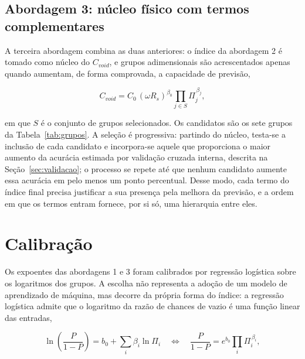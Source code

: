 \documentclass[12pt,openany]{report}
\begin{document}
\subsection{Abordagem 3: núcleo físico com termos complementares}
\label{sec:abordagem_c}

A terceira abordagem combina as duas anteriores: o índice da abordagem 2 é tomado como núcleo do $C_{void}$, e grupos adimensionais são acrescentados apenas quando aumentam, de forma comprovada, a capacidade de previsão,

\begin{equation}
C_{void} = C_0\,(\omega R_s)^{\beta_0} \prod_{j \in S} \Pi_{j}^{\,\beta_j},
\label{eq:cvoid_c}
\end{equation}

\noindent em que $S$ é o conjunto de grupos selecionados. Os candidatos são os sete grupos da Tabela~\ref{tab:grupos}. A seleção é progressiva: partindo do núcleo, testa-se a inclusão de cada candidato e incorpora-se aquele que proporciona o maior aumento da acurácia estimada por validação cruzada interna, descrita na Seção~\ref{sec:validacao}; o processo se repete até que nenhum candidato aumente essa acurácia em pelo menos um ponto percentual. Desse modo, cada termo do índice final precisa justificar a sua presença pela melhora da previsão, e a ordem em que os termos entram fornece, por si só, uma hierarquia entre eles.

\section{Calibração}
\label{sec:calibracao}

Os expoentes das abordagens 1 e 3 foram calibrados por regressão logística sobre os logaritmos dos grupos. A escolha não representa a adoção de um modelo de aprendizado de máquina, mas decorre da própria forma do índice: a regressão logística admite que o logaritmo da razão de chances de vazio é uma função linear das entradas,

\begin{equation}
\ln\left(\frac{P}{1-P}\right) = b_0 + \sum_i \beta_i \ln \Pi_i \quad \Longleftrightarrow \quad \frac{P}{1-P} = e^{b_0}\prod_i \Pi_{i}^{\,\beta_i},
\label{eq:logistica}
\end{equation}
\end{document}
